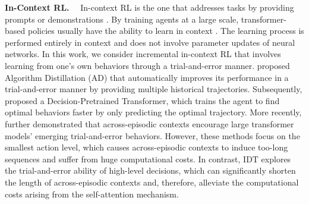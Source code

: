 \documentclass{article}
\theoremstyle{plain}
\theoremstyle{definition}
\theoremstyle{remark}
\begin{document}
\noindent\textbf{In-Context RL.}~~
In-context RL is the one that addresses tasks by providing prompts or demonstrations \cite{2,43}. By training agents at a large scale, transformer-based policies usually have the ability to learn in context \cite{14,27}. The learning process is performed entirely in context and does not involve parameter updates of neural networks. In this work, we consider incremental in-context RL that involves learning from one's own behaviors through a trial-and-error manner. \citet{8} proposed Algorithm Distillation (AD) that automatically improves its performance in a trial-and-error manner by providing multiple historical trajectories. Subsequently, \citet{44} proposed a Decision-Pretrained Transformer, which trains the agent to find optimal behaviors faster by only predicting the optimal trajectory. More recently, \citet{1} further demonstrated that across-episodic contexts encourage large transformer models' emerging trial-and-error behaviors. However, these methods focus on the smallest action level, which causes across-episodic contexts to induce too-long sequences and suffer from huge computational costs. In contrast, IDT explores the trial-and-error ability of high-level decisions, which can significantly shorten the length of across-episodic contexts and, therefore, alleviate the computational costs arising from the self-attention mechanism.
\end{document}
